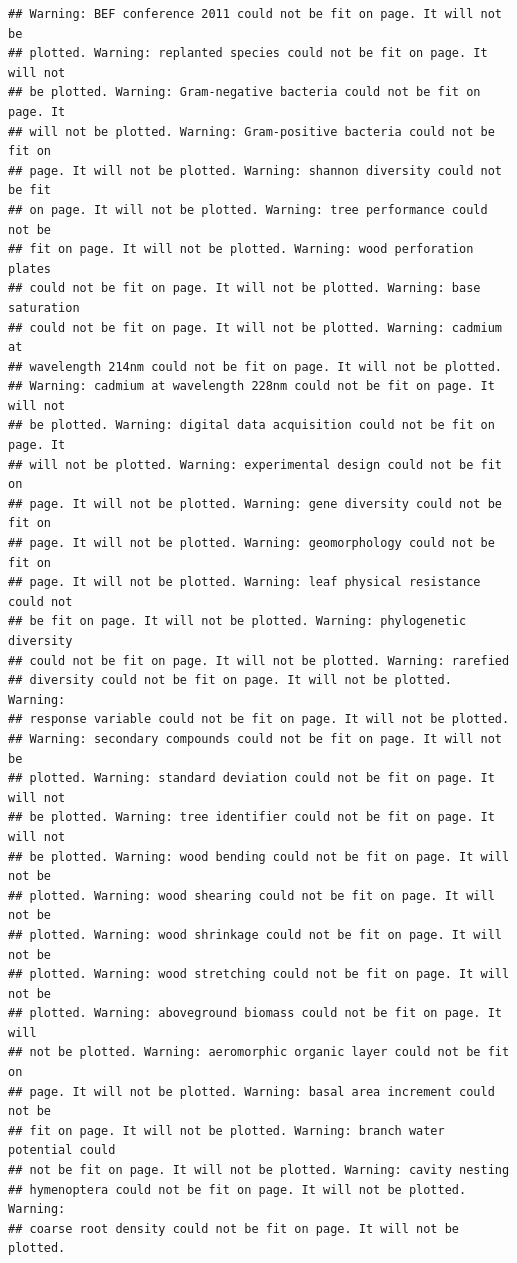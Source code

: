 \documentclass[]{article}
\begin{document}
\begin{verbatim}
## Warning: BEF conference 2011 could not be fit on page. It will not be
## plotted. Warning: replanted species could not be fit on page. It will not
## be plotted. Warning: Gram-negative bacteria could not be fit on page. It
## will not be plotted. Warning: Gram-positive bacteria could not be fit on
## page. It will not be plotted. Warning: shannon diversity could not be fit
## on page. It will not be plotted. Warning: tree performance could not be
## fit on page. It will not be plotted. Warning: wood perforation plates
## could not be fit on page. It will not be plotted. Warning: base saturation
## could not be fit on page. It will not be plotted. Warning: cadmium at
## wavelength 214nm could not be fit on page. It will not be plotted.
## Warning: cadmium at wavelength 228nm could not be fit on page. It will not
## be plotted. Warning: digital data acquisition could not be fit on page. It
## will not be plotted. Warning: experimental design could not be fit on
## page. It will not be plotted. Warning: gene diversity could not be fit on
## page. It will not be plotted. Warning: geomorphology could not be fit on
## page. It will not be plotted. Warning: leaf physical resistance could not
## be fit on page. It will not be plotted. Warning: phylogenetic diversity
## could not be fit on page. It will not be plotted. Warning: rarefied
## diversity could not be fit on page. It will not be plotted. Warning:
## response variable could not be fit on page. It will not be plotted.
## Warning: secondary compounds could not be fit on page. It will not be
## plotted. Warning: standard deviation could not be fit on page. It will not
## be plotted. Warning: tree identifier could not be fit on page. It will not
## be plotted. Warning: wood bending could not be fit on page. It will not be
## plotted. Warning: wood shearing could not be fit on page. It will not be
## plotted. Warning: wood shrinkage could not be fit on page. It will not be
## plotted. Warning: wood stretching could not be fit on page. It will not be
## plotted. Warning: aboveground biomass could not be fit on page. It will
## not be plotted. Warning: aeromorphic organic layer could not be fit on
## page. It will not be plotted. Warning: basal area increment could not be
## fit on page. It will not be plotted. Warning: branch water potential could
## not be fit on page. It will not be plotted. Warning: cavity nesting
## hymenoptera could not be fit on page. It will not be plotted. Warning:
## coarse root density could not be fit on page. It will not be plotted.

\end{verbatim}
\end{document}
